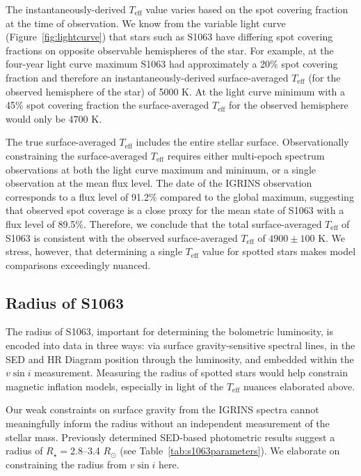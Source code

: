 \documentclass[twocolumn,tighten]{aastex631}
\begin{document}
The instantaneously-derived $T_{\mathrm{eff}}$ value varies based on the spot covering fraction at the time of observation. We know from the variable light curve (Figure~\ref{fig:lightcurve}) that stars such as S1063 have differing spot covering fractions on opposite observable hemispheres of the star. For example, at the four-year light curve maximum S1063 had approximately a 20\% spot covering fraction and therefore an instantaneously-derived surface-averaged $T_{\mathrm{eff}}$ (for the observed hemisphere of the star) of 5000 K. At the light curve minimum with a 45\% spot covering fraction the surface-averaged $T_{\mathrm{eff}}$ for the observed hemisphere would only be 4700 K. 

The true surface-averaged $T_{\mathrm{eff}}$ includes the entire stellar surface. Observationally constraining the surface-averaged $T_{\mathrm{eff}}$ requires either multi-epoch spectrum observations at both the light curve maximum and minimum, or a single observation at the mean flux level. The date of the IGRINS observation corresponds to a flux level of 91.2\% compared to the global maximum, suggesting that observed spot coverage is a close proxy for the mean state of S1063 with a flux level of 89.5\%. Therefore, we conclude that the total surface-averaged $T_{\mathrm{eff}}$ of S1063 is consistent with the observed surface-averaged $T_{\mathrm{eff}}$ of $4900\pm100$ K. We stress, however, that determining a single $T_{\mathrm{eff}}$ value for spotted stars makes model comparisons exceedingly nuanced. 


\subsection{Radius of S1063}
\label{sec:radius}

The radius of S1063, important for determining the bolometric luminosity, is encoded into data in three ways: via surface gravity-sensitive spectral lines, in the SED and HR Diagram position through the luminosity, and embedded within the $v\sin{i}$ measurement. Measuring the radius of spotted stars would help constrain magnetic inflation models, especially in light of the $T_{\mathrm{eff}}$ nuances elaborated above. 

Our weak constraints on surface gravity from the IGRINS spectra cannot meaningfully inform the radius without an independent measurement of the stellar mass. Previously determined SED-based photometric results suggest a radius of $R_{\star} = $2.8--3.4 $R_\odot$ (see Table~\ref{tab:s1063parameters}). We elaborate on constraining the radius from $v\sin{i}$ here. 
\end{document}
